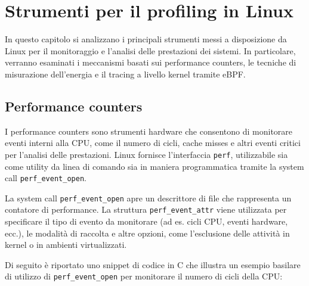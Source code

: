 \documentclass{article}
\begin{document}
\clearpage
\section{Strumenti per il profiling in Linux}

In questo capitolo si analizzano i principali strumenti messi a disposizione da Linux per il monitoraggio e l'analisi delle prestazioni dei sistemi. In particolare, verranno esaminati i meccanismi basati sui performance counters, le tecniche di misurazione dell'energia e il tracing a livello kernel tramite eBPF.

\subsection{Performance counters}

I performance counters sono strumenti hardware che consentono di monitorare eventi interni alla CPU, come il numero di cicli, cache misses e altri eventi critici per l'analisi delle prestazioni. Linux fornisce l'interfaccia \texttt{perf}\cite{perf-docs}, utilizzabile sia come utility da linea di comando sia in maniera programmatica tramite la system call \texttt{perf\_event\_open}.

La system call \texttt{perf\_event\_open} apre un descrittore di file che rappresenta un contatore di performance. La struttura \texttt{perf\_event\_attr} viene utilizzata per specificare il tipo di evento da monitorare (ad es. cicli CPU, eventi hardware, ecc.), le modalità di raccolta e altre opzioni, come l'esclusione delle attività in kernel o in ambienti virtualizzati.

Di seguito è riportato uno snippet di codice in C che illustra un esempio basilare di utilizzo di \texttt{perf\_event\_open} per monitorare il numero di cicli della CPU:
\end{document}
